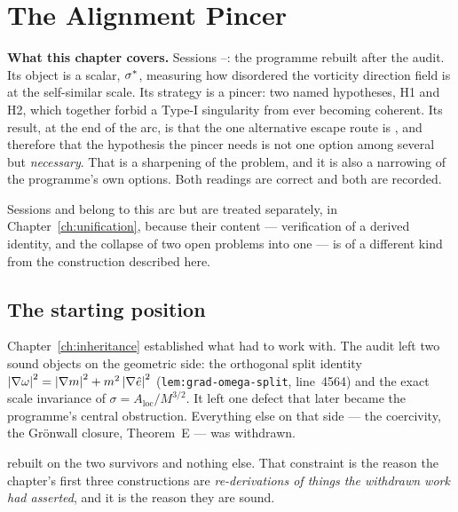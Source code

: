 \chapter{The Alignment Pincer}
\label{ch:pincer}

\begin{record}
\textbf{What this chapter covers.} Sessions --: the programme
rebuilt after the audit. Its object is a scalar, \(\sigma^{*}\), measuring how
disordered the vorticity direction field is at the self-similar scale. Its
strategy is a pincer: two named hypotheses, H1 and H2, which together forbid a
Type-I singularity from ever becoming coherent. Its result, at the end of the
arc, is that the one alternative escape route is \IMPOSSIBLE{}, and therefore
that the hypothesis the pincer needs is not one option among several but
\emph{necessary}. That is a sharpening of the problem, and it is also a
narrowing of the programme's own options. Both readings are correct and both
are recorded.

\smallskip
Sessions  and  belong to this arc but are treated separately, in
Chapter~\ref{ch:unification}, because their content --- verification of a
derived identity, and the collapse of two open problems into one --- is of a
different kind from the construction described here.
\end{record}

\section{The starting position}
\label{sec:pincer-start}

Chapter~\ref{ch:inheritance} established what  had to work with. The
 audit left two sound objects on the geometric side: the orthogonal
split identity \(\left|\nabla\omega\right|^2=\left|\nabla m\right|^2+m^2\left|\nabla\hat{e}\right|^2\)
(\texttt{lem:grad-omega-split}, line~4564) and the exact scale invariance of
\(\sigma=A_{\mathrm{loc}}/M^{3/2}\). It left one defect that later became the
programme's central obstruction. Everything else on that side --- the
coercivity, the Gr\"onwall closure, Theorem~E --- was withdrawn.

 rebuilt on the two survivors and nothing else. That constraint is the
reason the chapter's first three constructions are \emph{re-derivations of
things the withdrawn work had asserted}, and it is the reason they are sound.

